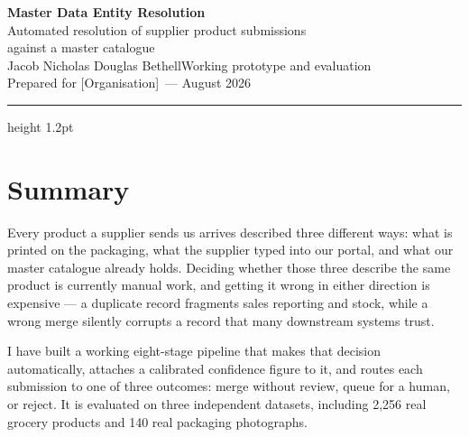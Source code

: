 \newcommand{\orgname}{[Organisation]}
\newcommand{\authorname}{Jacob Nicholas Douglas Bethell}



\begin{center}
  {\LARGE\bfseries\color{accent} Master Data Entity Resolution}\\[0.35em]
  {\large Automated resolution of supplier product submissions\\
   against a master catalogue}\\[0.9em]
  {\normalsize \authorname\quad\textbullet\quad Working prototype and evaluation}\\[0.2em]
  {\small\color{black!55} Prepared for \orgname\ --- August 2026}
\end{center}

\vspace{0.4em}
{\color{rulegrey}\hrule height 1.2pt}
\vspace{1.0em}

\section*{Summary}

Every product a supplier sends us arrives described three different ways: what
is printed on the packaging, what the supplier typed into our portal, and what
our master catalogue already holds. Deciding whether those three describe the
same product is currently manual work, and getting it wrong in either direction
is expensive --- a duplicate record fragments sales reporting and stock, while a
wrong merge silently corrupts a record that many downstream systems trust.

I have built a working eight-stage pipeline that makes that decision
automatically, attaches a calibrated confidence figure to it, and routes each
submission to one of three outcomes: merge without review, queue for a human, or
reject. It is evaluated on three independent datasets, including 2{,}256 real
grocery products and 140 real packaging photographs.


